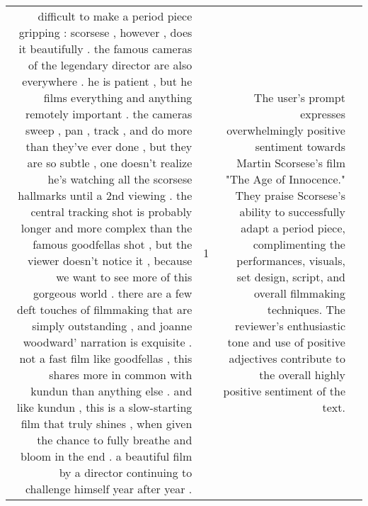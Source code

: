 \begin{tabular}{r{1cm} p{0.4in} r{1cm} p{0.4in}}
difficult to make a period piece gripping : scorsese , however , does it beautifully .  the famous cameras of the legendary director are also everywhere .  he is patient , but he films everything and anything remotely important .  the cameras sweep , pan , track , and do more than they've ever done , but they are so subtle , one doesn't realize he's watching all the scorsese hallmarks until a 2nd viewing .  the central tracking shot is probably longer and more complex than the famous goodfellas shot , but the viewer doesn't notice it , because we want to see more of this gorgeous world .  there are a few deft touches of filmmaking that are simply outstanding , and joanne woodward' narration is exquisite .  not a fast film like goodfellas , this shares more in common with kundun than anything else .  and like kundun , this is a slow-starting film that truly shines , when given the chance to fully breathe and bloom in the end .  a beautiful film by a director continuing to challenge himself year after year .   & 1 & The user's prompt expresses overwhelmingly positive sentiment towards Martin Scorsese's film "The Age of Innocence." They praise Scorsese's ability to successfully adapt a period piece, complimenting the performances, visuals, set design, script, and overall filmmaking techniques. The reviewer's enthusiastic tone and use of positive adjectives contribute to the overall highly positive sentiment of the text. \\

\end{tabular}
